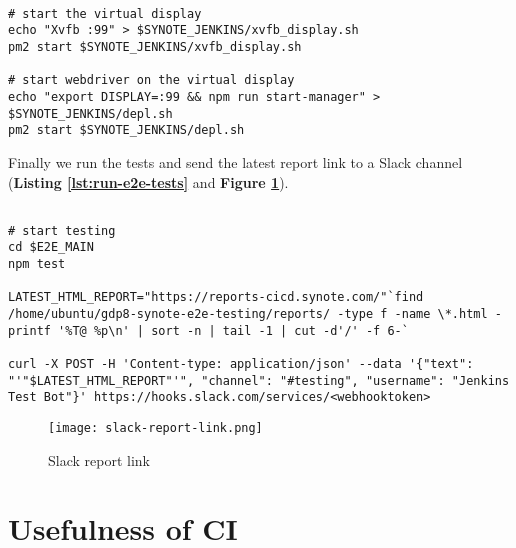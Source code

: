 \begin{listing}[H]
\begin{verbatim}

# start the virtual display
echo "Xvfb :99" > $SYNOTE_JENKINS/xvfb_display.sh
pm2 start $SYNOTE_JENKINS/xvfb_display.sh

# start webdriver on the virtual display
echo "export DISPLAY=:99 && npm run start-manager" > $SYNOTE_JENKINS/depl.sh
pm2 start $SYNOTE_JENKINS/depl.sh

\end{verbatim}
\label{lst:webdriver-pm2}
\end{listing}

Finally we run the tests and send the latest report link to a Slack channel (\textbf{Listing \ref{lst:run-e2e-tests}} and \textbf{Figure \ref{fig:slack-report-link}}).

\begin{listing}[H]
\begin{verbatim}

# start testing
cd $E2E_MAIN
npm test

LATEST_HTML_REPORT="https://reports-cicd.synote.com/"`find /home/ubuntu/gdp8-synote-e2e-testing/reports/ -type f -name \*.html -printf '%T@ %p\n' | sort -n | tail -1 | cut -d'/' -f 6-`

curl -X POST -H 'Content-type: application/json' --data '{"text": "'"$LATEST_HTML_REPORT"'", "channel": "#testing", "username": "Jenkins Test Bot"}' https://hooks.slack.com/services/<webhooktoken>

\end{verbatim}
\label{lst:run-e2e-tests}
\end{listing}

\begin{figure}[!hbt]
  	\centering
 	\texttt{[image: slack-report-link.png]}
  	\caption{Slack report link}
 	\label{fig:slack-report-link}
\end{figure}

\section{Usefulness of CI}
\label{sec:usefulness-of-ci}
